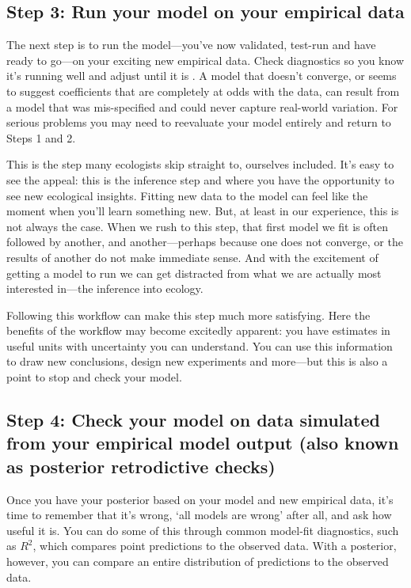 \documentclass[11pt]{article}
\begin{document}
 \subsection*{Step 3: Run your model on your empirical data} 
 
The next step is to run the model---you've now validated, test-run and have ready to go---on your exciting new empirical data. Check diagnostics so you know it's running well and adjust until it is \citep[this includes a suite of convergence and efficiency metrics that are well-discussed elsewhere,][]{betanworkflow,gelman2020bayesian,vandeschoot2021,gabryvis}. A model that doesn't converge, or seems to suggest coefficients that are completely at odds with the data, can result from a model that was mis-specified and could never capture real-world variation. For serious problems you may need to reevaluate your model entirely and return to Steps 1 and 2.
 
This is the step many ecologists skip straight to, ourselves included. It's easy to see the appeal: this is the inference step and where you have the opportunity to see new ecological insights. Fitting new data to the model can feel like the moment when you'll learn something new. But, at least in our experience, this is not always the case. When we rush to this step, that first model we fit is often followed by another, and another---perhaps because one does not converge, or the results of another do not make immediate sense. And with the excitement of getting a model to run we can get distracted from what we are actually most interested in---the inference into ecology. 

Following this workflow can make this step much more satisfying. Here the benefits of the workflow may become excitedly apparent: you have estimates in useful units with uncertainty you can understand. You can use this information to draw new conclusions, design new experiments and more---but this is also a point to stop and check your model. 

\subsection*{Step 4: Check your model on data simulated from your empirical model output (also known as posterior retrodictive checks)} 

Once you have your posterior based on your model and new empirical data, it's time to remember that it's wrong, `all models are wrong' after all, and ask how useful it is. You can do some of this through common model-fit diagnostics, such as $R^2$, which compares point predictions to the observed data. With a posterior, however, you can compare an entire distribution of predictions to the observed data. 
\end{document}

